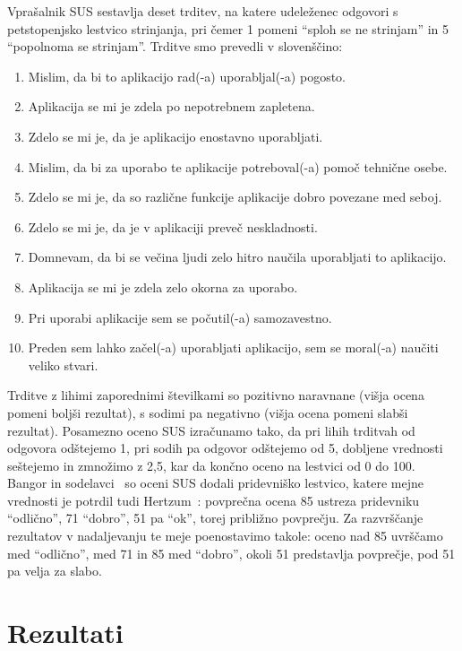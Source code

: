 Vprašalnik SUS sestavlja deset trditev, na katere udeleženec odgovori s petstopenjsko lestvico strinjanja, pri čemer 1 pomeni ``sploh se ne strinjam'' in 5 ``popolnoma se strinjam''. Trditve smo prevedli v slovenščino:

\begin{enumerate}
    \item Mislim, da bi to aplikacijo rad(-a) uporabljal(-a) pogosto.
    \item Aplikacija se mi je zdela po nepotrebnem zapletena.
    \item Zdelo se mi je, da je aplikacijo enostavno uporabljati.
    \item Mislim, da bi za uporabo te aplikacije potreboval(-a) pomoč tehnične osebe.
    \item Zdelo se mi je, da so različne funkcije aplikacije dobro povezane med seboj.
    \item Zdelo se mi je, da je v aplikaciji preveč neskladnosti.
    \item Domnevam, da bi se večina ljudi zelo hitro naučila uporabljati to aplikacijo.
    \item Aplikacija se mi je zdela zelo okorna za uporabo.
    \item Pri uporabi aplikacije sem se počutil(-a) samozavestno.
    \item Preden sem lahko začel(-a) uporabljati aplikacijo, sem se moral(-a) naučiti veliko stvari.
\end{enumerate}

Trditve z lihimi zaporednimi številkami so pozitivno naravnane (višja ocena pomeni boljši rezultat), s sodimi pa negativno (višja ocena pomeni slabši rezultat). Posamezno oceno SUS izračunamo tako, da pri lihih trditvah od odgovora odštejemo 1, pri sodih pa odgovor odštejemo od 5, dobljene vrednosti seštejemo in zmnožimo z 2,5, kar da končno oceno na lestvici od 0 do 100. Bangor in sodelavci~\cite{bangor2009determining} so oceni SUS dodali pridevniško lestvico, katere mejne vrednosti je potrdil tudi Hertzum~\cite{hertzum2026meta}: povprečna ocena 85 ustreza pridevniku ``odlično'', 71 ``dobro'', 51 pa ``ok'', torej približno povprečju. Za razvrščanje rezultatov v nadaljevanju te meje poenostavimo takole: oceno nad 85 uvrščamo med ``odlično'', med 71 in 85 med ``dobro'', okoli 51 predstavlja povprečje, pod 51 pa velja za slabo.

\clearpage
\section{Rezultati}
\label{sec:eval-rezultati}

